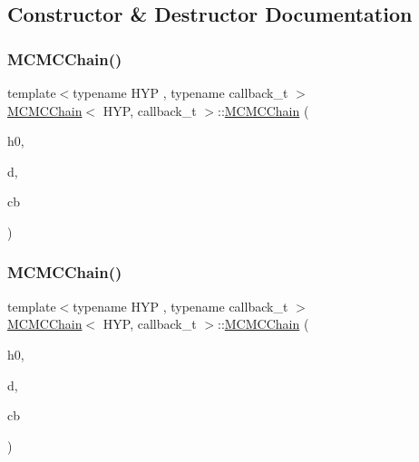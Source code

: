 \subsection{Constructor \& Destructor Documentation}
\mbox{\label{class_m_c_m_c_chain_aed5ffea5a46a380b8b0d78cd46c96a97}} 
\subsubsection{\texorpdfstring{M\+C\+M\+C\+Chain()}{MCMCChain()}\hspace{0.1cm}{\footnotesize\ttfamily [1/6]}}
{\footnotesize\ttfamily template$<$typename H\+YP , typename callback\+\_\+t $>$ \\
\hyperlink{class_m_c_m_c_chain}{M\+C\+M\+C\+Chain}$<$ H\+YP, callback\+\_\+t $>$\+::\hyperlink{class_m_c_m_c_chain}{M\+C\+M\+C\+Chain} (\begin{DoxyParamCaption}\item[{H\+YP \&}]{h0,  }\item[{typename H\+Y\+P\+::data\+\_\+t $\ast$}]{d,  }\item[{callback\+\_\+t \&}]{cb }\end{DoxyParamCaption})\hspace{0.3cm}{\ttfamily [inline]}}

\mbox{\label{class_m_c_m_c_chain_a731f2ca6416f1daa84cd54cd3f9281b2}} 
\subsubsection{\texorpdfstring{M\+C\+M\+C\+Chain()}{MCMCChain()}\hspace{0.1cm}{\footnotesize\ttfamily [2/6]}}
{\footnotesize\ttfamily template$<$typename H\+YP , typename callback\+\_\+t $>$ \\
\hyperlink{class_m_c_m_c_chain}{M\+C\+M\+C\+Chain}$<$ H\+YP, callback\+\_\+t $>$\+::\hyperlink{class_m_c_m_c_chain}{M\+C\+M\+C\+Chain} (\begin{DoxyParamCaption}\item[{H\+YP \&\&}]{h0,  }\item[{typename H\+Y\+P\+::data\+\_\+t $\ast$}]{d,  }\item[{callback\+\_\+t \&}]{cb }\end{DoxyParamCaption})\hspace{0.3cm}{\ttfamily [inline]}}

